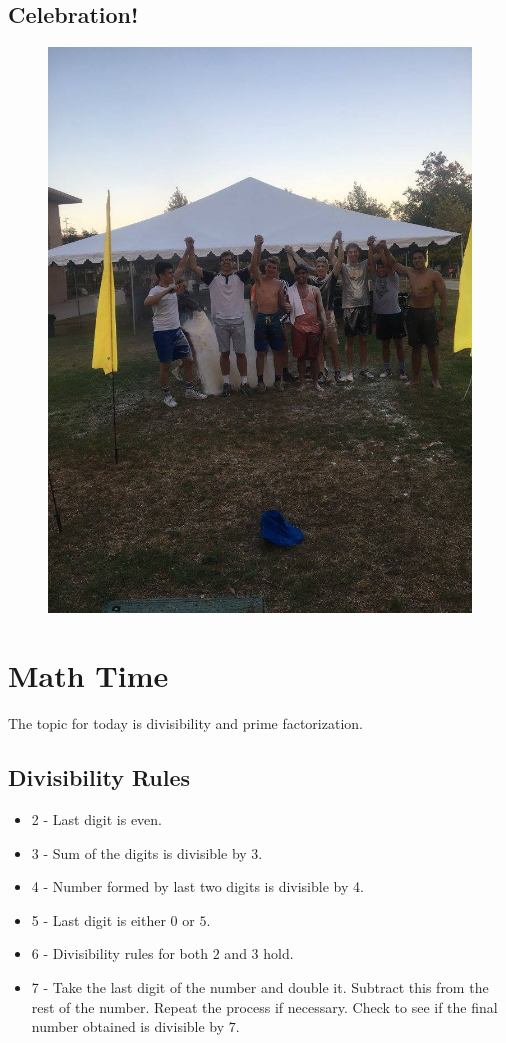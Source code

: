\clearpage
\subsection*{Celebration!}

\begin{figure}[h]
	\centering\includegraphics[width=0.32\linewidth]{images/crib2.jpg}
\end{figure}

\clearpage  

\section{Math Time}

The topic for today is divisibility and prime factorization.  %

\clearpage

\subsection{Divisibility Rules}

\begin{itemize}
\item  2 - Last digit is even.
\item  3 - Sum of the digits is divisible by 3.
\item 4  - Number formed by last two digits is divisible by 4.
\item 5 - Last digit is either $0$ or $5$.
\item 6 -  Divisibility rules for both $2$ and $3$ hold.
\item 7  - Take the last digit of the number and double it.  Subtract this from the rest of the number.  Repeat the process if necessary.  Check to see if the final number obtained is divisible by $7$.
\end{itemize}


\clearpage

